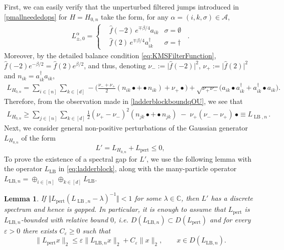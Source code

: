 \documentclass[11pt]{amsart}
\newcommand{\1}{\mathbbm{1}}
\theoremstyle{plain}
\newtheorem{lemma}[theorem]{Lemma}
\theoremstyle{definition}
\theoremstyle{remark}
\numberwithin{equation}{section}
\begin{document}
\medskip

\noindent First, we can easily verify that the unperturbed filtered jumps introduced in \eqref{pmallneededops} for $H=H_{0,n}$ take the form, for any $\alpha=(i,k,\sigma)\in\mathcal{A}$,
\begin{align*}
L_{\pm,0}^{\alpha}=\left\{\begin{aligned}
&\widehat f(-2)\,e^{\mp\beta/4}a_{ik}&\sigma=\emptyset\\
&\widehat{f}(2)\,e^{\mp\beta/4}a^\dagger_{ik}&\sigma=\dagger
\end{aligned}\,\,\,\right. .
\end{align*}
Moreover, by the detailed balance condition \eqref{eq:KMSFilterFunction}, $\widehat f(-2)e^{-\beta/2}=\widehat f(2)e^{\beta/2}$, and thus, denoting $\nu_{-}:=\vert  \widehat{f}(-2)\vert^2 $, $\nu_{+}:=\vert  \widehat{f}(2)\vert^2$ and $n_{ik}=a_{ik}^\dagger a_{ik}$,
\begin{align}
\label{eq:HSgenerator-specialized}
L_{H_{0,n}}
=\sum_{i\in[n]}\sum_{k\in[d]}
-\Big(\frac{\nu_-+\nu_+}{2}(n_{ik} \bullet +\bullet n_{ik})+\nu_+\bullet \Big)
+\sqrt{\nu_+\nu_-}\big(a_{ik} \bullet  a_{ik}^\dagger+a_{ik}^\dagger \bullet a_{ik}\big).
\end{align}
Therefore, from the observation made in \eqref{ladderblockboundqOU}, we see that
\begin{align}
L_{H_{0,n}}\ge \sum_{j\in[n]}\sum_{k\in[d]} \frac{1}{2}(\nu_+ - \nu_-)^2 (n_{jk} \bullet + \bullet n_{jk}) \;-\; \nu_+(\nu_- - \nu_+)\, \bullet\equiv L_{\operatorname{LB},n}\,.
\end{align}
\noindent Next, we consider general non-positive perturbations of the Gaussian generator $L_{H_{0,n}}$ of the form
\[
L' = L_{H_{0,n}} + L_{\operatorname{pert}}\le 0,
\]
To prove the existence of a spectral gap for $L'$, we use the following lemma with the operator $L_{\mathrm{LB}}$ in \eqref{eq:ladderblock}, along with the many-particle operator $L_{\text{LB},n}=\oplus_{i\in[n]}\oplus_{k\in[d]} L_{\text{LB}}.$


\begin{lemma}
\label{lem:compact_resolv}
If $\Vert L_{\operatorname{pert}} (L_{\operatorname{LB},n}-\lambda )^{-1} \Vert <1$
for some $\lambda\in\mathbb{C}$, then $L'$ has a discrete spectrum and hence is gapped. In particular, it is enough to assume that $L_{\operatorname{pert}}$ is
 $L_{\mathrm{LB},n}$-bounded with relative bound $0$, i.e. $D(L_{\mathrm{LB},n})\subset D(L_{\mathrm{pert}})$
and for every $\varepsilon>0$ there exists $C_\varepsilon\ge 0$ such that
\[
\|L_{\mathrm{pert}}x\|_2
\le
\varepsilon \|L_{\mathrm{LB},n}x\|_2+C_\varepsilon \|x\|_2,
\qquad x\in D(L_{\mathrm{LB},n}).
\]



\end{lemma}
\end{document}
